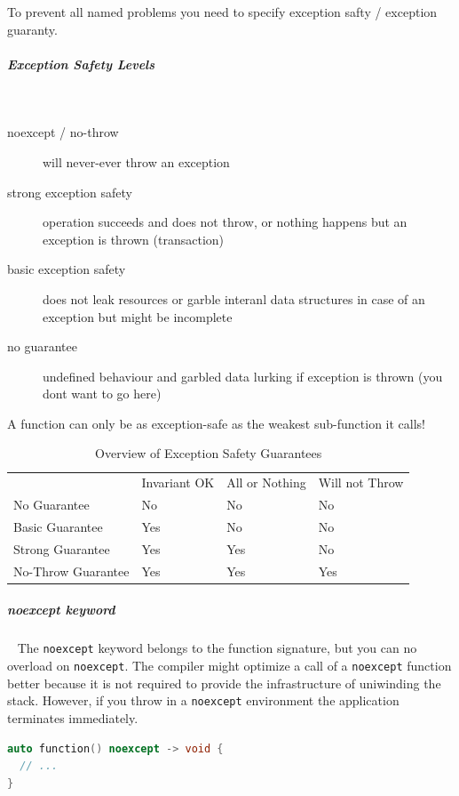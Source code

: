 \documentclass[11pt,twoside,landscape]{article}
\begin{document}
\begin{multicols}{2}
To prevent all named problems you need to specify exception safty / exception guaranty.

\subparagraph{Exception Safety Levels} \
\label{sec:org627b767}
\begin{description}
\item[{noexcept / no-throw}] will never-ever throw an exception
\item[{strong exception safety}] operation succeeds and does not throw, or nothing happens but an exception is thrown (transaction)
\item[{basic exception safety}] does not leak resources or garble interanl data structures in case of an exception but might be incomplete
\item[{no guarantee}] undefined behaviour and garbled data lurking if exception is thrown (you dont want to go here)
\end{description}


A function can only be as exception-safe as the weakest sub-function it calls!


\begin{table}[htbp]
\caption{\label{tbl:overview-of-exception-safety-guarantees}Overview of Exception Safety Guarantees}
\centering
\begin{tabular}{llll}
 & Invariant OK & All or Nothing & Will not Throw\\[0pt]
No Guarantee & No & No & No\\[0pt]
Basic Guarantee & Yes & No & No\\[0pt]
Strong Guarantee & Yes & Yes & No\\[0pt]
No-Throw Guarantee & Yes & Yes & Yes\\[0pt]
\end{tabular}
\end{table}

\subparagraph{noexcept keyword} \
\label{sec:orgff2778f}
The \texttt{noexcept} keyword belongs to the function signature, but you can no overload on \texttt{noexcept}.
The compiler might optimize a call of a \texttt{noexcept} function better because it is not required to provide the infrastructure of uniwinding the stack.
However, if you throw in a \texttt{noexcept} environment the application terminates immediately.


\begin{lstlisting}[language=c++,label=lst:exaple-for-noexcept-in-signature,caption={Exaple for noexcept in signature},captionpos=b,numbers=none]
auto function() noexcept -> void {
  // ...
}


\end{lstlisting}
\end{multicols}
\end{document}
